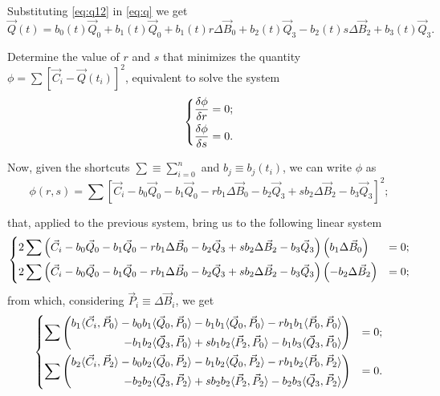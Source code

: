 \documentclass{scrartcl}
\newcommand\V[1]{\vec{#1}}
\newcommand\SP[2]{\langle #1, #2 \rangle}
\begin{document}
Substituting \eqref{eq:q12} in \eqref{eq:q} we get
\begin{equation*}
\V{Q}(t) = b_0(t) \V{Q}_0 + b_1(t) \V{Q}_0 + b_1(t) r \Delta \V{B}_0 +
b_2(t) \V{Q}_3 - b_2(t) s \Delta \V{B}_2 + b_3(t) \V{Q}_3.
\end{equation*}

Determine the value of $r$ and $s$ that minimizes the quantity
$\phi = \sum \left[ \V{C}_i - \V{Q}(t_i) \right]^2$, equivalent to
solve the system
\begin{equation*}
\begin{dcases}
\frac{\delta\phi}{\delta r} = 0;\\
\frac{\delta\phi}{\delta s} = 0.
\end{dcases}
\end{equation*}

Now, given the shortcuts $\sum \equiv \sum_{i=0}^{n} $ and $b_j \equiv
b_j(t_i)$, we can write $\phi$ as
\begin{equation*}
    \phi(r, s) = \sum \left[ \V{C}_i - b_0 \V{Q}_0 - b_1 \V{Q}_0 -
    r b_1 \Delta \V{B}_0 - b_2 \V{Q}_3 + s b_2 \Delta \V{B}_2 - b_3 \V{Q}_3 \right]^2;
\end{equation*}

that, applied to the previous system, bring us to the following linear system
\begin{equation*}
\begin{dcases}
    2 \sum \left(
	\V{C}_i - b_0 \V{Q}_0 - b_1 \V{Q}_0 - r b_1 \Delta \V{B}_0 -
	b_2 \V{Q}_3 + s b_2 \Delta \V{B}_2 - b_3 \V{Q}_3
    \right) \left( b_1 \Delta \V{B}_0 \right) &= 0; \\
    2 \sum \left(
	\V{C}_i - b_0 \V{Q}_0 - b_1 \V{Q}_0 - r b_1 \Delta \V{B}_0 -
	b_2 \V{Q}_3 + s b_2 \Delta \V{B}_2 - b_3 \V{Q}_3
    \right) \left( -b_2 \Delta \V{B}_2 \right) &= 0; \\
\end{dcases}
\end{equation*}
from which, considering $\V{P}_i \equiv \Delta \V{B}_i$, we get
\begin{equation*}
\begin{dcases}
    \sum \left(
    \begin{split}
	b_1       \SP{\V{C}_i}{\V{P}_0} -
	b_0 b_1   \SP{\V{Q}_0}{\V{P}_0} -
	b_1 b_1   \SP{\V{Q}_0}{\V{P}_0} -
	r b_1 b_1 \SP{\V{P}_0}{\V{P}_0} \\ -
	b_1 b_2   \SP{\V{Q}_3}{\V{P}_0} +
	s b_1 b_2 \SP{\V{P}_2}{\V{P}_0} -
	b_1 b_3   \SP{\V{Q}_3}{\V{P}_0}
    \end{split}
    \right) &= 0; \\
    \sum \left(
    \begin{split}
	b_2       \SP{\V{C}_i}{\V{P}_2} -
	b_0 b_2   \SP{\V{Q}_0}{\V{P}_2} -
	b_1 b_2   \SP{\V{Q}_0}{\V{P}_2} -
	r b_1 b_2 \SP{\V{P}_0}{\V{P}_2} \\ -
	b_2 b_2   \SP{\V{Q}_3}{\V{P}_2} +
	s b_2 b_2 \SP{\V{P}_2}{\V{P}_2} -
	b_2 b_3   \SP{\V{Q}_3}{\V{P}_2}
    \end{split}
    \right) &= 0. \\
\end{dcases}
\end{equation*}
\end{document}
